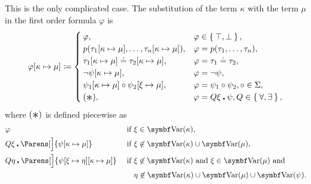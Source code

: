 \begin{definition}
\begin{DefEnum}
     This is the only complicated case. The substitution of the term \( \kappa \) with the term \( \mu \) in the first order formula \( \varphi \) is
    \begin{equation}\label{eq:def:first_order_substitution/term_in_formula}
      \varphi[\kappa \mapsto \mu] \coloneqq \begin{cases}
        \varphi,                                                           &\varphi \in \Set{ \top, \bot }, \\
        p(\tau_1[\kappa \mapsto \mu], \ldots, \tau_n[\kappa \mapsto \mu]), &\varphi = p(\tau_1, \ldots, \tau_n), \\
        \tau_1[\kappa \mapsto \mu] \doteq \tau_2[\kappa \mapsto \mu],      &\varphi = \tau_1 \doteq \tau_2, \\
        \neg \psi[\kappa \mapsto \mu],                                     &\varphi = \neg \psi, \\
        \psi_1[\kappa \mapsto \mu] \circ \psi_2[\xi \mapsto \mu],          &\varphi = \psi_1 \circ \psi_2, \circ \in \Sigma, \\
        (\Ast),                                                            &\varphi = Q \xi \centerdot \psi, Q \in \Set{ \forall, \exists },
      \end{cases}
    \end{equation}
    where \( (\Ast) \) is defined piecewise as
    \begin{align}
      &\varphi                                                                     &&\T{if} \xi \in \Bold{Var}(\kappa), \label{eq:def:first_order_substitution/term_in_formula/quantifiers/trivial} \\
      &Q \xi \centerdot \Parens[\Big]{\psi[\kappa \mapsto \mu]}                    &&\T{if} \xi \not\in \Bold{Var}(\kappa) \cup \Bold{Var}(\mu), \label{eq:def:first_order_substitution/term_in_formula/quantifiers/direct} \\
      &Q \eta \centerdot \Parens[\Big]{\psi[\xi \mapsto \eta][\kappa \mapsto \mu]} &&\T{if} \xi \not\in \Bold{Var}(\kappa) \T{and} \xi \in \Bold{Var}(\mu) \T{and} \label{eq:def:first_order_substitution/term_in_formula/quantifiers/renaming} \\
                                                                                   &&&\phantom{\T{if}} \eta \not\in \Bold{Var}(\kappa) \cup \Bold{Var}(\mu) \cup \Bold{Var}(\psi). \nonumber
    \end{align}


\end{DefEnum}
\end{definition}
